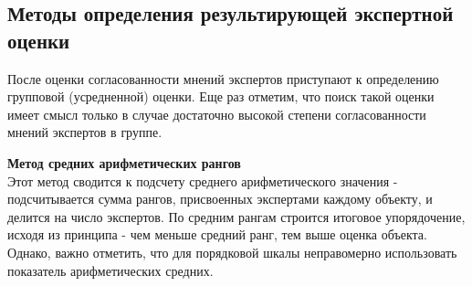 \documentclass[a4paper,12pt]{extreport}
\begin{document}




\subsection*{Методы определения результирующей экспертной оценки} %
\label{sub:Final_methods}

После оценки согласованности мнений экспертов приступают к определению групповой
(усредненной) оценки. Еще раз отметим, что поиск такой оценки имеет смысл только
в случае достаточно высокой степени согласованности мнений экспертов в группе.

\noindent \textbf{Метод средних арифметических рангов}\hfill \\
Этот метод сводится к подсчету среднего арифметического значения - подсчитывается
сумма рангов, присвоенных экспертами каждому объекту, и делится на число экспертов.
По средним рангам строится итоговое упорядочение, исходя из принципа - чем меньше
средний ранг, тем выше оценка объекта. Однако, важно отметить, что для порядковой
шкалы неправомерно использовать показатель арифметических средних.
\end{document}
